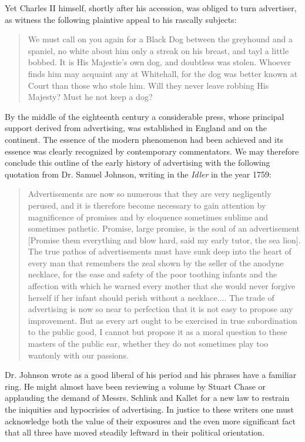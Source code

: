 \documentclass[nohyper,openany,nobib]{tufte-book}
\begin{document}
Yet Charles II himself, shortly after his accession, was obliged to turn
advertiser, as witness the following plaintive appeal to his rascally
subjects:

\begin{quote}
We must call on you again for a Black Dog between the greyhound and a
spaniel, no white about him only a streak on his breast, and tayl a
little bobbed. It is His Majestie's own dog, and doubtless was stolen.
Whoever finds him may acquaint any at Whitehall, for the dog was better
known at Court than those who stole him. Will they never leave robbing
His Majesty? Must he not keep a dog?
\end{quote}

By the middle of the eighteenth century a considerable press, whose
principal support derived from advertising, was established in England
and on the continent. The essence of the modern phenomenon had been
achieved and its essence was clearly recognized by contemporary
commentators. We may therefore conclude this outline of the early
history of advertising with the following quotation from Dr. Samuel
Johnson, writing in the \emph{Idler} in the year 1759:

\begin{quote}
Advertisements are now so numerous that they are very negligently
perused, and it is therefore become necessary to gain attention by
magnificence of promises and by eloquence sometimes sublime and
sometimes pathetic. Promise, large promise, is the soul of an
advertisement {[}Promise them everything and blow hard, said my early
tutor, the sea lion{]}. The true pathos of advertisements must have sunk
deep into the heart of every man that remembers the zeal shown by the
seller of the anodyne necklace, for the ease and safety of the poor
toothing infants and the affection with which he warned every mother
that she would never forgive herself if her infant should perish without
a necklace.... The trade of advertising is now so near to perfection
that it is not easy to propose any improvement. But as every art ought
to be exercised in true subordination to the public good, I cannot but
propose it as a moral question to these masters of the public ear,
whether they do not sometimes play too wantonly with our passions.
\end{quote}

Dr. Johnson wrote as a good liberal of his period and his phrases have a
familiar ring. He might almost have been reviewing a volume by Stuart
Chase or applauding the demand of Messrs. Schlink and Kallet for a new
law to restrain the iniquities and hypocrisies of advertising. In
justice to these writers one must acknowledge both the value of their
exposures and the even more significant fact that all three have moved
steadily leftward in their political orientation.
\end{document}
